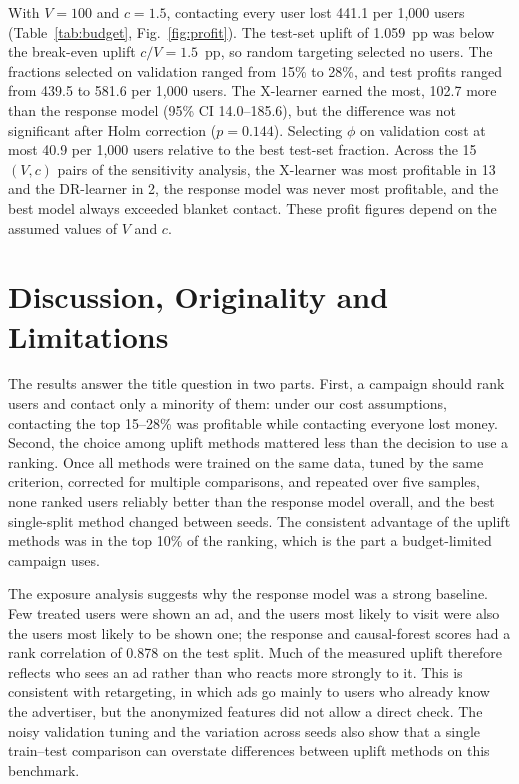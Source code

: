 \documentclass[conference]{IEEEtran}
\begin{document}
With \(V=100\) and \(c=1.5\), contacting every user lost 441.1 per
1,000 users (Table~\ref{tab:budget}, Fig.~\ref{fig:profit}). The
test-set uplift of 1.059~pp was below the break-even uplift
\(c/V=1.5\)~pp, so random targeting selected no users. The fractions
selected on validation ranged from 15\% to 28\%, and test profits ranged
from 439.5 to 581.6 per 1,000 users. The X-learner earned the most,
102.7 more than the response model (95\% CI 14.0--185.6), but the
difference was not significant after Holm correction (\(p=0.144\)).
Selecting \(\phi\) on validation cost at most 40.9 per 1,000 users
relative to the best test-set fraction. Across the 15 \((V,c)\) pairs
of the sensitivity analysis, the X-learner was most profitable in 13
and the DR-learner in 2, the response model was never most profitable,
and the best model always exceeded blanket contact. These profit
figures depend on the assumed values of \(V\) and \(c\).

\section{Discussion, Originality and Limitations}

The results answer the title question in two parts. First, a campaign
should rank users and contact only a minority of them: under our cost
assumptions, contacting the top 15--28\% was profitable while contacting
everyone lost money. Second, the choice among uplift methods mattered
less than the decision to use a ranking. Once all methods were trained
on the same data, tuned by the same criterion, corrected for multiple
comparisons, and repeated over five samples, none ranked users reliably
better than the response model overall, and the best single-split
method changed between seeds. The consistent advantage of the uplift
methods was in the top 10\% of the ranking, which is the part a
budget-limited campaign uses.

The exposure analysis suggests why the response model was a strong
baseline. Few treated users were shown an ad, and the users most likely
to visit were also the users most likely to be shown one; the response
and causal-forest scores had a rank correlation of 0.878 on the test
split. Much of the measured uplift therefore reflects who sees an ad
rather than who reacts more strongly to it. This is consistent with
retargeting, in which ads go mainly to users who already know the
advertiser, but the anonymized features did not allow a direct check.
The noisy validation tuning and the variation across seeds also show
that a single train--test comparison can overstate differences between
uplift methods on this benchmark.
\end{document}
